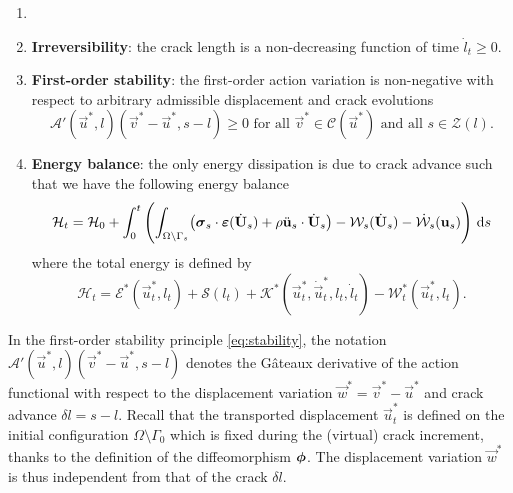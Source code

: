 \begin{model} \label{model:griffith}
\begin{enumerate}
\item[]
\item \textbf{Irreversibility}: the crack length is a non-decreasing function of time $\dot{l}_t\geq 0$.
\item \textbf{First-order stability}: the first-order action variation is non-negative with respect to arbitrary admissible displacement and crack evolutions
\begin{equation} \label{eq:stability}
\mathcal{A}'(\vec{u}^*,l)(\vec{v}^*-\vec{u}^*,s-l)\geq 0\text{ for all $\vec{v}^*\in\mathcal{C}(\vec{u}^*)$ and all $s\in\mathcal{Z}(l)$}.
\end{equation}
\item \textbf{Energy balance}: the only energy dissipation is due to crack advance such that we have the following energy balance
\begin{equation} \label{eq:eb}
\mathcal{H}_t=\mathcal{H}_0+\int_0^t\left(\int_{\Omega\setminus\Gamma_s}\bigl(\sig_s\cdot\eps(\dot{\vec{U}}_s)+\rho\ddot{\vec{u}}_s\cdot\dot{\vec{U}}_s\bigr)-\mathcal{W}_s(\dot{\vec{U}}_s)-\dot{\mathcal{W}}_s(\vec{u}_s)\right)\D{s}
\end{equation}
where the total energy is defined by
\begin{equation}
\mathcal{H}_t=\mathcal{E}^*(\vec{u}_t^*,l_t)+\mathcal{S}(l_t)+\mathcal{K}^*(\vec{u}_t^*,\dot{\vec{u}}_t^*,l_t,\dot{l}_t)-\mathcal{W}^*_t(\vec{u}_t^*,l_t).
\end{equation}
\end{enumerate}
\end{model}

In the first-order stability principle \eqref{eq:stability}, the notation $\mathcal{A}'(\vec{u}^*,l)(\vec{v}^*-\vec{u}^*,s-l)$ denotes the Gâteaux derivative of the action functional with respect to the displacement variation $\vec{w}^*=\vec{v}^*-\vec{u}^*$ and crack advance $\delta l=s-l$. Recall that the transported displacement $\vec{u}_t^*$ is defined on the initial configuration $\Omega\setminus\Gamma_0$ which is fixed during the (virtual) crack increment, thanks to the definition of the diffeomorphism $\philt$. The displacement variation $\vec{w}^*$ is thus independent from that of the crack $\delta l$.

